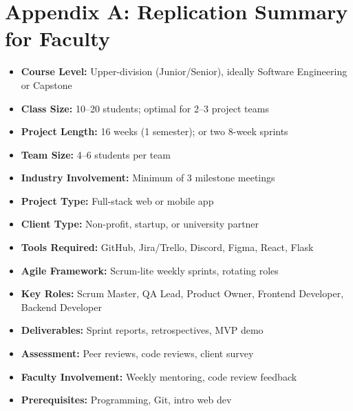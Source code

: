 \documentclass{article}
\begin{document}
\section*{Appendix A: Replication Summary for Faculty}

\begin{itemize}[noitemsep]
  \item \textbf{Course Level:} Upper-division (Junior/Senior), ideally Software Engineering or Capstone
  \item \textbf{Class Size:} 10--20 students; optimal for 2--3 project teams
  \item \textbf{Project Length:} 16 weeks (1 semester); or two 8-week sprints
  \item \textbf{Team Size:} 4--6 students per team
  \item \textbf{Industry Involvement:} Minimum of 3 milestone meetings
  \item \textbf{Project Type:} Full-stack web or mobile app
  \item \textbf{Client Type:} Non-profit, startup, or university partner
  \item \textbf{Tools Required:} GitHub, Jira/Trello, Discord, Figma, React, Flask
  \item \textbf{Agile Framework:} Scrum-lite weekly sprints, rotating roles
  \item \textbf{Key Roles:} Scrum Master, QA Lead, Product Owner, Frontend Developer, Backend Developer
  \item \textbf{Deliverables:} Sprint reports, retrospectives, MVP demo
  \item \textbf{Assessment:} Peer reviews, code reviews, client survey
  \item \textbf{Faculty Involvement:} Weekly mentoring, code review feedback
  \item \textbf{Prerequisites:} Programming, Git, intro web dev
\end{itemize}
\end{document}
